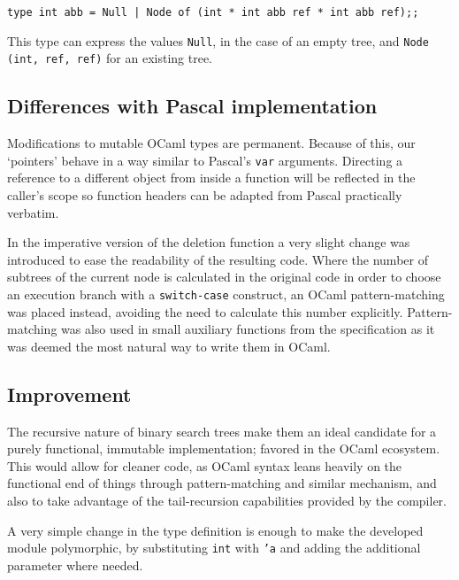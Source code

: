 \documentclass[11pt]{scrartcl} %
\begin{document}
\texttt{type int abb = Null | Node of (int * int abb ref * int abb ref);;} 

This type can express the values \texttt{Null}, in the case of an empty tree, and \texttt{Node (int, ref, ref)} for an existing tree.

\subsection*{Differences with Pascal implementation}

Modifications to mutable OCaml types are permanent. Because of this, our `pointers' behave in a way similar to Pascal's \texttt{var} arguments. Directing a reference to a different object from inside a function will be reflected in the caller's scope so function headers can be adapted from Pascal practically verbatim.

In the imperative version of the deletion function a very slight change was introduced to ease the readability of the resulting code. Where the number of subtrees of the current node is calculated in the original code in order to choose an execution branch with a \texttt{switch-case} construct, an OCaml pattern-matching was placed instead, avoiding the need to calculate this number explicitly. Pattern-matching was also used in small auxiliary functions from the specification as it was deemed the most natural way to write them in OCaml.

\subsection*{Improvement}
The recursive nature of binary search trees make them an ideal candidate for a purely functional, immutable implementation; favored in the OCaml ecosystem. This would allow for cleaner code, as OCaml syntax leans heavily on the functional end of things through pattern-matching and similar mechanism, and also to take advantage of the tail-recursion capabilities provided by the compiler.

A very simple change in the type definition is enough to make the developed module polymorphic, by substituting \texttt{int} with \texttt{'a} and adding the additional parameter where needed.
\end{document}
